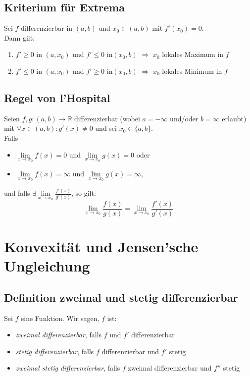 \documentclass[halfparscip]{scrartcl}
\newcounter{subsection2}
\begin{document}
\addtocounter{subsection}{2}
\subsection{Kriterium für Extrema}
Sei $f$ differenzierbar in $(a,b)$ und $x_0 \in (a,b)$ mit $f'(x_0) = 0$.\\
Dann gilt:
\begin{enumerate}
	\item $f' \geq 0$ in $(a,x_0)$ und $f'\leq 0$ in$(x_0,b)$ $\Rightarrow$ $x_0$ lokales Maximum in $f$
	\item $f' \leq 0$ in $(a,x_0)$ und $f'\geq 0$ in$(x_0,b)$ $\Rightarrow$ $x_0$ lokales Minimum in $f$
\end{enumerate}

\subsection{Regel von l'Hospital}
Seien $f,g : (a,b) \rightarrow \mathbb{R}$ differenzierbar (wobei $a = -\infty$ und/oder $b = \infty$ erlaubt) mit $\forall x \in(a,b) : g'(x) \neq 0$ und sei $x_0 \in \{a,b\}$.\\
Falls
\begin{itemize}
	\item $\lim\limits_{x \rightarrow x_0} f(x) = 0$ und $\lim\limits_{x \rightarrow x_0} g(x) = 0$ oder
	\item $\lim\limits_{x \rightarrow x_0} f(x) = \infty$ und $\lim\limits_{x \rightarrow x_0} g(x) = \infty$,
\end{itemize}
und falls $\exists \lim\limits_{x \rightarrow x_0} \frac{f'(x)}{g'(x)}$, so gilt:
\begin{equation*}
	\lim\limits_{x \rightarrow x_0} \frac{f(x)}{g(x)} = \lim\limits_{x \rightarrow x_0} \frac{f'(x)}{g'(x)}
\end{equation*}

\setcounter{subsection2}{\value{subsection}}
\section*{Konvexität und Jensen'sche Ungleichung}
\setcounter{subsection}{\value{subsection2}}

\addtocounter{subsection}{2}
\subsection{Definition zweimal und stetig differenzierbar}
Sei $f$ eine Funktion. Wir sagen, $f$ ist:
\begin{itemize}
	\item \textit{zweimal differenzierbar}, falls $f$ und $f'$ differenzierbar
	\item \textit{stetig differenzierbar}, falls $f$ differenzierbar und $f'$ stetig
	\item \textit{zweimal stetig differenzierbar}, falls $f$ zweimal differenzierbar und $f''$ stetig
\end{itemize}
\end{document}
